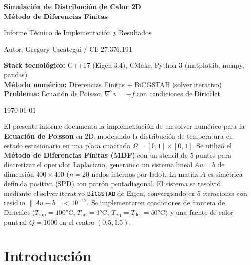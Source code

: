 \documentclass[12pt,a4paper]{article}
\theoremstyle{definition}
\newcommand{\norm}[1]{\|#1\|}
\begin{document}
\begin{titlepage}
    \centering
    \vspace*{2cm}
    {\Huge\bfseries Simulaci\'{o}n de Distribuci\'{o}n de Calor 2D\\[0.3cm] M\'{e}todo de Diferencias Finitas\par}
    \vspace{1.5cm}
    {\Large Informe T\'{e}cnico de Implementaci\'{o}n y Resultados\par}
    \vspace{2cm}
    {\Large Autor: Gregory Uzcategui / CI: 27.376.191 \par}
    \vspace{2cm}
    {\large
    \textbf{Stack tecnol\'{o}gico:} C++17 (Eigen 3.4), CMake, Python 3 (matplotlib, numpy, pandas)\\[0.5cm]
    \textbf{M\'{e}todo num\'{e}rico:} Diferencias Finitas + BiCGSTAB (solver iterativo)\\[0.5cm]
    \textbf{Problema:} Ecuaci\'{o}n de Poisson $\nabla^2 u = -f$ con condiciones de Dirichlet
    \par}
    \vfill
    {\large \today\par}
\end{titlepage}

\noindent
El presente informe documenta la implementaci\'{o}n de un solver num\'{e}rico para la \textbf{Ecuaci\'{o}n de Poisson} en 2D, modelando la distribuci\'{o}n de temperatura en estado estacionario en una placa cuadrada $\Omega = [0,1] \times [0,1]$. Se utiliz\'{o} el \textbf{M\'{e}todo de Diferencias Finitas (MDF)} con un stencil de 5 puntos para discretizar el operador Laplaciano, generando un sistema lineal $Au = b$ de dimensi\'{o}n $400 \times 400$ ($n = 20$ nodos internos por lado). La matriz $A$ es sim\'{e}trica definida positiva (SPD) con patr\'{o}n pentadiagonal. El sistema se resolvi\'{o} mediante el solver iterativo \texttt{BiCGSTAB} de Eigen, convergiendo en 5 iteraciones con residuo $\norm{Au - b} < 10^{-12}$. Se implementaron condiciones de frontera de Dirichlet ($T_{\text{sup}} = 100\text{°C}$, $T_{\text{inf}} = 0\text{°C}$, $T_{\text{izq}} = T_{\text{der}} = 50\text{°C}$) y una fuente de calor puntual $Q = 1000$ en el centro $(0.5, 0.5)$.

\tableofcontents
\newpage

\section{Introducci\'{o}n}\label{sec:intro}
\end{document}
